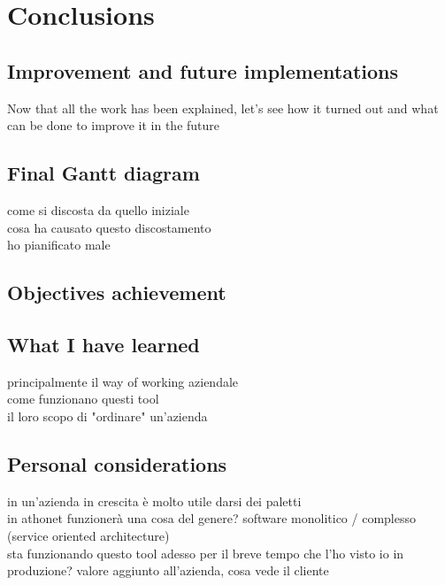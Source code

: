 \chapter{Conclusions}
\label{conclusions}

\section{Improvement and future implementations}

Now that all the work has been explained, let's see how it turned out and what can be done to improve it in the future

\section{Final Gantt diagram}
	come si discosta da quello iniziale\\
	cosa ha causato questo discostamento\\
	ho pianificato male
	
\section{Objectives achievement}

\section{What I have learned}
	principalmente il way of working aziendale\\
	come funzionano questi tool\\
	il loro scopo di "ordinare" un'azienda

\section{Personal considerations}
	in un'azienda in crescita è molto utile darsi dei paletti\\
	in athonet funzionerà una cosa del genere?  software monolitico / complesso (service oriented architecture)\\
	sta funzionando questo tool adesso per il breve tempo che l'ho visto io in produzione?
	valore aggiunto all'azienda, cosa vede il cliente